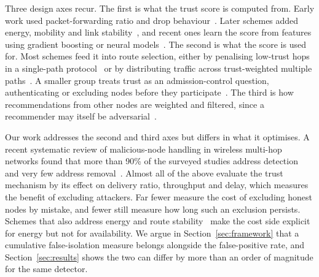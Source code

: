 \documentclass[pdflatex,sn-mathphys-num]{sn-jnl}%
\theoremstyle{thmstyleone}%
\theoremstyle{thmstyletwo}%
\theoremstyle{thmstylethree}%
\begin{document}
Three design axes recur. The first is what the trust score is computed
from. Early work used packet-forwarding ratio and drop
behaviour~\cite{xia2013trust,sanchez2015model}. Later schemes added energy,
mobility and link stability~\cite{veeraiah2021trust,thirunavukkarasu2022cluster},
and recent ones learn the score from features using gradient boosting or
neural models~\cite{ryu2023reputation,dhand2025secure}. The second is what
the score is used for. Most schemes feed it into route selection, either by
penalising low-trust hops in a single-path
protocol~\cite{pathan2018efficient,pari2023enhanced} or by distributing
traffic across trust-weighted multiple
paths~\cite{sirajuddin2021tbsmr,srilakshmi2021improved,srilakshmi2022secure}.
A smaller group treats trust as an admission-control question,
authenticating or excluding nodes before they
participate~\cite{tu2021active,lwin2020blockchain}. The third is how
recommendations from other nodes are weighted and filtered, since a
recommender may itself be
adversarial~\cite{singh2020self,rajeswari2021efficient,pari2023hybrid}.

Our work addresses the second and third axes but differs in what it
optimises. A recent systematic review of malicious-node handling in wireless
multi-hop networks found that more than 90\% of the surveyed studies address
detection and very few address removal~\cite{pourdehghan2025review}. Almost all of the above evaluate the trust mechanism by its
effect on delivery ratio, throughput and delay, which measures the benefit
of excluding attackers. Far fewer measure the cost of excluding honest nodes
by mistake, and fewer still measure how long such an exclusion persists.
Schemes that also address energy and route
stability~\cite{thirunavukkarasu2022cluster,ponguwala2019e2sr} make the cost
side explicit for energy but not for availability. We argue in
Section~\ref{sec:framework} that a cumulative false-isolation measure
belongs alongside the false-positive rate, and Section~\ref{sec:results}
shows the two can differ by more than an order of magnitude for the same
detector.
\end{document}
